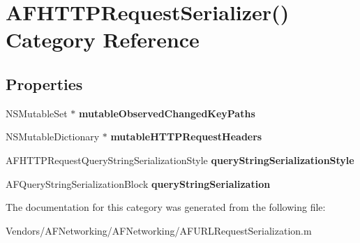 \hypertarget{category_a_f_h_t_t_p_request_serializer_07_08}{}\section{A\+F\+H\+T\+T\+P\+Request\+Serializer() Category Reference}
\label{category_a_f_h_t_t_p_request_serializer_07_08}
\subsection*{Properties}
\begin{DoxyCompactItemize}
\item 
\hypertarget{category_a_f_h_t_t_p_request_serializer_07_08_a6a2639f207d8a45968c3c7425b484e00}{}N\+S\+Mutable\+Set $\ast$ {\bfseries mutable\+Observed\+Changed\+Key\+Paths}\label{category_a_f_h_t_t_p_request_serializer_07_08_a6a2639f207d8a45968c3c7425b484e00}

\item 
\hypertarget{category_a_f_h_t_t_p_request_serializer_07_08_a655ff64b4b2109962ff0808bf7e232ad}{}N\+S\+Mutable\+Dictionary $\ast$ {\bfseries mutable\+H\+T\+T\+P\+Request\+Headers}\label{category_a_f_h_t_t_p_request_serializer_07_08_a655ff64b4b2109962ff0808bf7e232ad}

\item 
\hypertarget{category_a_f_h_t_t_p_request_serializer_07_08_a62472cba41bf66900965ba97f3df4667}{}A\+F\+H\+T\+T\+P\+Request\+Query\+String\+Serialization\+Style {\bfseries query\+String\+Serialization\+Style}\label{category_a_f_h_t_t_p_request_serializer_07_08_a62472cba41bf66900965ba97f3df4667}

\item 
\hypertarget{category_a_f_h_t_t_p_request_serializer_07_08_a76c33177f36c3fd1d97a264b4f3a15fe}{}A\+F\+Query\+String\+Serialization\+Block {\bfseries query\+String\+Serialization}\label{category_a_f_h_t_t_p_request_serializer_07_08_a76c33177f36c3fd1d97a264b4f3a15fe}

\end{DoxyCompactItemize}


The documentation for this category was generated from the following file\+:\begin{DoxyCompactItemize}
\item 
Vendors/\+A\+F\+Networking/\+A\+F\+Networking/A\+F\+U\+R\+L\+Request\+Serialization.\+m\end{DoxyCompactItemize}
